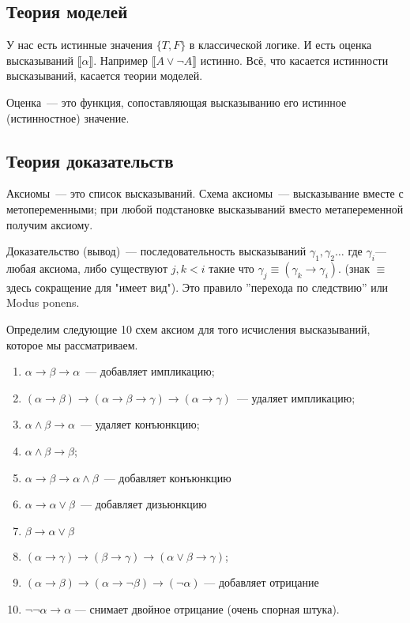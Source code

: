 \subsection{Теория моделей}
У нас есть истинные значения $\{T, F\}$ в классической логике. 
И есть оценка высказываний $\llbracket \alpha\rrbracket$. 
Например $\llbracket A \lor \neg A\rrbracket$ истинно.
Всё, что касается истинности высказываний, касается теории моделей. 
\begin{definition}
    Оценка~--- это функция, сопоставляющая высказыванию его истинное (истинностное) значение.
\end{definition}
\subsection{Теория доказательств}
\begin{definition}
    Аксиомы~--- это список высказываний.
    Схема аксиомы~--- высказывание вместе с метопеременными; при любой подстановке высказываний вместо метапеременной получим аксиому. 
\end{definition}

\begin{definition}
    Доказательство (вывод)~--- последовательность высказываний $\gamma_1, \gamma_2\ldots$ где $\gamma_i$--- любая аксиома, 
    либо существуют $j,k < i$ такие что $\gamma_j \equiv (\gamma_k \to \gamma_i)$.
    (знак $\equiv$ здесь сокращение для "имеет вид").
    Это правило ''перехода по следствию'' или Modus ponens.
\end{definition}

Определим следующие 10 схем аксиом для того исчисления высказываний, которое мы рассматриваем. 
\begin{enumerate}
    \item $\alpha \to \beta \to \alpha$~--- добавляет импликацию;
    \item $(\alpha \to \beta) \to (\alpha \to \beta \to \gamma) \to (\alpha \to \gamma)$~--- удаляет импликацию;
    \item $\alpha \land \beta \to \alpha$~--- удаляет конъюнкцию;
    \item $\alpha \land \beta \to \beta$;
    \item $\alpha \to \beta \to \alpha \land \beta$~--- добавляет конъюнкцию
    \item $\alpha \to \alpha \lor \beta$~--- добавляет дизьюнкцию
    \item $\beta \to \alpha \lor \beta$
    \item $(\alpha \to \gamma) \to (\beta \to \gamma) \to (\alpha \lor \beta \to \gamma)$; 
    \item $(\alpha \to \beta) \to (\alpha \to \neg \beta) \to (\neg \alpha)$ --- добавляет отрицание
    \item $\neg \neg \alpha \to \alpha$ --- снимает двойное отрицание (очень спорная штука).
\end{enumerate}

